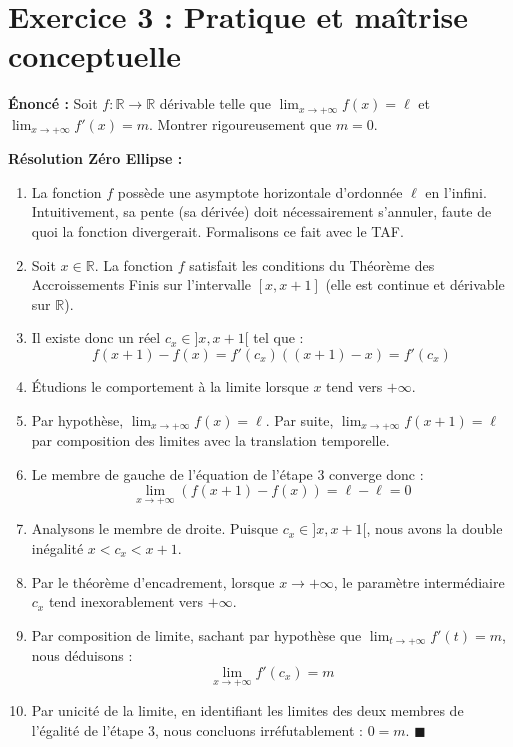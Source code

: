\documentclass[11pt,a4paper]{article}
\begin{document}
\vspace{1em}

\section*{Exercice 3 : Pratique et maîtrise conceptuelle}

\textbf{Énoncé :}
Soit $f : \mathbb{R} \to \mathbb{R}$ dérivable telle que $\lim_{x \to +\infty} f(x) = \ell$ et $\lim_{x \to +\infty} f'(x) = m$. Montrer rigoureusement que $m = 0$.

\textbf{Résolution Zéro Ellipse :}
\begin{enumerate}
\item La fonction $f$ possède une asymptote horizontale d'ordonnée $\ell$ en l'infini. Intuitivement, sa pente (sa dérivée) doit nécessairement s'annuler, faute de quoi la fonction divergerait. Formalisons ce fait avec le TAF.
\item Soit $x \in \mathbb{R}$. La fonction $f$ satisfait les conditions du Théorème des Accroissements Finis sur l'intervalle $[x, x+1]$ (elle est continue et dérivable sur $\mathbb{R}$).
\item Il existe donc un réel $c_x \in ]x, x+1[$ tel que :
   \[  f(x+1) - f(x) = f'(c_x)((x+1) - x) = f'(c_x)  \]
\item Étudions le comportement à la limite lorsque $x$ tend vers $+\infty$.
\item Par hypothèse, $\lim_{x \to +\infty} f(x) = \ell$. Par suite, $\lim_{x \to +\infty} f(x+1) = \ell$ par composition des limites avec la translation temporelle.
\item Le membre de gauche de l'équation de l'étape 3 converge donc :
   \[  \lim_{x \to +\infty} (f(x+1) - f(x)) = \ell - \ell = 0  \]
\item Analysons le membre de droite. Puisque $c_x \in ]x, x+1[$, nous avons la double inégalité $x < c_x < x+1$.
\item Par le théorème d'encadrement, lorsque $x \to +\infty$, le paramètre intermédiaire $c_x$ tend inexorablement vers $+\infty$.
\item Par composition de limite, sachant par hypothèse que $\lim_{t \to +\infty} f'(t) = m$, nous déduisons :
   \[  \lim_{x \to +\infty} f'(c_x) = m  \]
\item Par unicité de la limite, en identifiant les limites des deux membres de l'égalité de l'étape 3, nous concluons irréfutablement : $0 = m$. $\blacksquare$
\end{enumerate}
\end{document}
